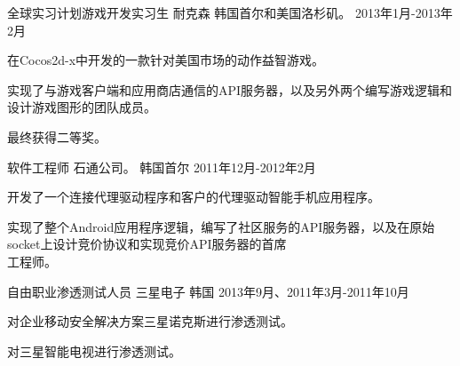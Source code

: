 \begin{cventries}
  \cventry
    {全球实习计划游戏开发实习生} %
    {耐克森} %
    {韩国首尔和美国洛杉矶。} %
    {2013年1月-2013年2月} %
    {
      \begin{cvitems} %
        \item {在Cocos2d-x中开发的一款针对美国市场的动作益智游戏。}
        \item {实现了与游戏客户端和应用商店通信的API服务器，以及另外两个编写游戏逻辑和设计游戏图形的团队成员。}
        \item {最终获得二等奖。}
      \end{cvitems}
    }

  \cventry
    {软件工程师} %
    {石通公司。} %
    {韩国首尔} %
    {2011年12月-2012年2月} %
    {
      \begin{cvitems} %
        \item {开发了一个连接代理驱动程序和客户的代理驱动智能手机应用程序。}
        \item {实现了整个Android应用程序逻辑，编写了社区服务的API服务器，以及在原始socket上设计竞价协议和实现竞价API服务器的首席\\工程师。}
      \end{cvitems}
    }

  \cventry
    {自由职业渗透测试人员} %
    {三星电子} %
    {韩国} %
    {2013年9月、2011年3月-2011年10月} %
    {
      \begin{cvitems} %
        \item {对企业移动安全解决方案三星诺克斯进行渗透测试。}
        \item {对三星智能电视进行渗透测试。}
      \end{cvitems}
    }

\end{cventries}

